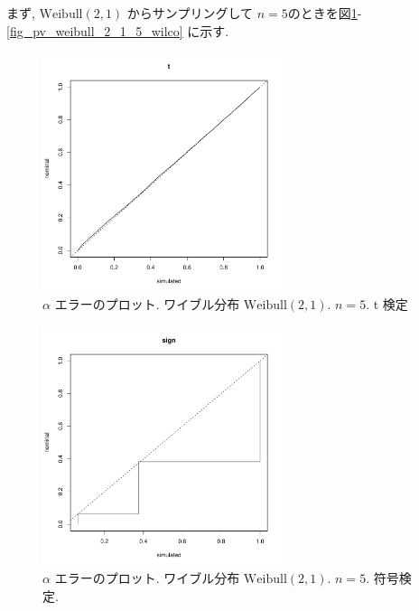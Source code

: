 \documentclass[12pt]{jsarticle}
\begin{document}
まず, $\mathrm{Weibull}(2 ,1)$ からサンプリングして $n=5$のときを図\ref{fig_pv_weibull_2_1_5_t}-\ref{fig_pv_weibull_2_1_5_wilco} に示す.

\begin{figure}[htbp]
  \begin{center}
\includegraphics[width=70mm]{img/pv_weibull_2_1_n5_t.pdf}
  \end{center}
     \caption{$\alpha$ エラーのプロット. ワイブル分布 $\mathrm{Weibull}(2,1)$. $n=5$. t 検定}
  \label{fig_pv_weibull_2_1_5_t}
 \end{figure}
 
 \begin{figure}[htbp]
 \begin{center}
  \includegraphics[width=70mm]{img/pv_weibull_2_1_n5_sign.pdf}
 \end{center}
      \caption{$\alpha$ エラーのプロット. ワイブル分布 $\mathrm{Weibull}(2,1)$. $n=5$. 符号検定.}
     \end{figure}  
\end{document}
